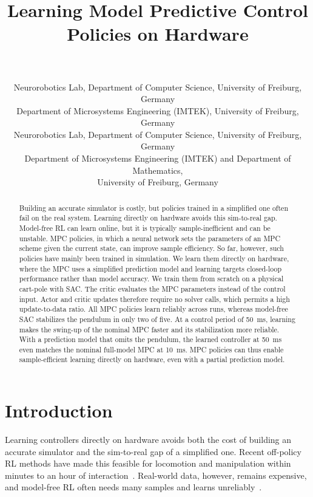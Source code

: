 \documentclass{l4dc2027}
\title{Learning Model Predictive Control Policies on Hardware}
\author{%
 \Name{Julian Wurm}\\
 \Name{Jasper Hoffmann} \Email{hoffmaja@informatik.uni-freiburg.de}\\
 \addr Neurorobotics Lab, Department of Computer Science, University of Freiburg, Germany
 \AND
 \Name{Leonard Fichtner}\\
 \addr Department of Microsystems Engineering (IMTEK), University of Freiburg, Germany
 \AND
 \Name{Joschka Boedecker}\\
 \addr Neurorobotics Lab, Department of Computer Science, University of Freiburg, Germany
 \AND
 \Name{Moritz Diehl}\\
 \addr Department of Microsystems Engineering (IMTEK) and Department of Mathematics,\\
 University of Freiburg, Germany%
}
\let\cite\citep
\begin{document}
\maketitle

\begin{abstract}
Building an accurate simulator is costly, but policies trained in a simplified
one often fail on the real system. Learning directly on hardware avoids this
sim-to-real gap. Model-free \ac{RL} can learn online, but it is
typically sample-inefficient and can be unstable.
\Ac{MPC} policies, in which a neural network sets the
parameters of an \ac{MPC} scheme given the current state, can improve sample
efficiency. So far, however, such policies have mainly been trained in
simulation. We learn them directly on hardware, where the
\ac{MPC} uses a simplified prediction model and learning targets closed-loop
performance rather than model accuracy. We train them from scratch on a
physical cart-pole with \ac{SAC}. The critic evaluates the
\ac{MPC} parameters instead of the control input. Actor and critic updates
therefore require no solver calls, which permits a high update-to-data ratio.
All \ac{MPC} policies learn reliably across runs, whereas model-free \ac{SAC}
stabilizes the pendulum in only two of five. At a control period of 50~ms,
learning makes the swing-up of the nominal \ac{MPC} faster and its
stabilization more reliable. With a prediction model that omits the pendulum, the learned
controller at 50~ms even matches the nominal full-model \ac{MPC} at 10~ms.
\ac{MPC} policies can
thus enable sample-efficient learning directly on hardware, even with a partial
prediction model.
\end{abstract}
\acresetall

\section{Introduction}

Learning controllers directly on hardware avoids both the cost of building an
accurate simulator and the sim-to-real gap of a simplified one. Recent
off-policy \ac{RL} methods have made this feasible for locomotion and
manipulation within minutes to an hour of
interaction~\cite{smith2022walk,bohlinger2025gait,luo2024serl}. Real-world
data, however, remains expensive, and model-free \ac{RL} often needs many
samples and learns unreliably~\cite{dulacarnold2019challenges}.
\end{document}
